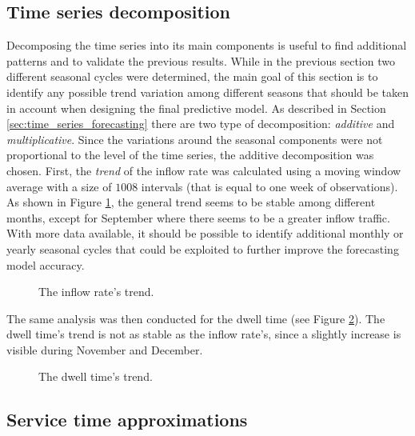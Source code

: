 \subsection{Time series decomposition}
\label{subsec:time_series_decomposition}

Decomposing the time series into its main components is useful to find additional patterns and to validate the previous results. While in the previous section two different seasonal cycles were determined, the main goal of this section is to identify any possible trend variation among different seasons that should be taken in account when designing the final predictive model. As described in Section \ref{sec:time_series_forecasting} there are two type of decomposition: \emph{additive} and \emph{multiplicative}. Since the variations around the seasonal components were not proportional to the level of the time series, the additive decomposition was chosen.
First, the \emph{trend} of the inflow rate was calculated using a moving window average with a size of \( 1008 \) intervals (that is equal to one week of observations). As shown in Figure \ref{fig:inflow_rate_trend}, the general trend seems to be stable among different months, except for September where there seems to be a greater inflow traffic. With more data available, it should be possible to identify additional monthly or yearly seasonal cycles that could be exploited to further improve the forecasting model accuracy.

\begin{figure}
  \begin{center}
  \end{center}
  \caption{The inflow rate's trend.}
  \label{fig:inflow_rate_trend}
\end{figure}

The same analysis was then conducted for the dwell time (see Figure \ref{fig:dwell_time_trend}). The dwell time’s trend is not as stable as the inflow rate’s, since a slightly increase is visible during November and December.

\begin{figure}
  \begin{center}
  \end{center}
  \caption{The dwell time's trend.}
  \label{fig:dwell_time_trend}
\end{figure}

\subsection{Service time approximations}
\label{subsec:service_time_approximations}


